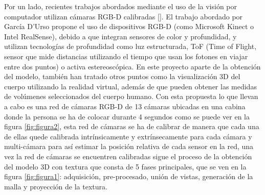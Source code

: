 Por un lado, recientes trabajos abordados mediante el uso de la visión por computador utilizan cámaras RGB-D calibradas [\cite{Nahuel1}]. El trabajo abordado por García D'Urso propone el uso de dispositivos RGB-D (como Microsoft Kinect o Intel RealSense), debido a que integran sensores de color y profundidad, y utilizan tecnologías de profundidad como luz estructurada, ToF (Time of Flight, sensor que mide distancias utilizando el tiempo que usan los fotones en viajar entre dos puntos) o activa estereoscópica. En este proyecto aparte de la obtención del modelo, también han tratado otros puntos como la visualización 3D del cuerpo utilizando la realidad virtual, además de que pueden obtener las medidas de volúmenes seleccionados del cuerpo humano. Con esta propuesta lo que llevan a cabo es una red de cámaras RGB-D de 13 cámaras ubicadas en una cabina donde la persona se ha de colocar durante 4 segundos como se puede ver en la figura \ref{fig:figura2}, esta red de cámaras se ha de calibrar de manera que cada una de ellas quede calibrada intrínsicamente y extrínsecamente para cada cámara y multi-cámara para así estimar la posición relativa de cada sensor en la red, una vez la red de cámaras se encuentren calibradas sigue el proceso de la obtención del modelo 3D con textura que consta de 5 fases principales, que se ven en la figura \ref{fig:figura1}: adquisición, pre-procesado, unión de vistas, generación de la malla y proyección de la textura.
